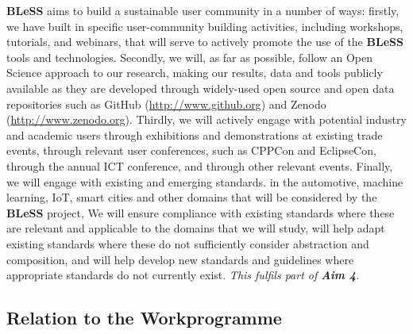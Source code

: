 \documentclass[a4paper,11pt]{article}
\newcommand{\project}[1]{\textbf{#1}\xspace}
\newcommand{\BLESS}{\project{BLeSS}}
\newcommand{\TheProject}{\BLESS}
\begin{document}
 \TheProject{} aims to build a sustainable user community in a number of ways: firstly, we have built in
 specific user-community building activities,
 including workshops, tutorials, and webinars, that will serve to
 actively promote the use of the \TheProject{} tools and technologies.
 Secondly, we will, as far as possible, follow an Open Science approach to our research,
 making our results, data and tools publicly available as they are
 developed through widely-used open source and
 open data repositories such as GitHub (\url{http://www.github.org}) and
 Zenodo (\url{http://www.zenodo.org}).  Thirdly, we will actively
 engage with potential industry and academic users through exhibitions
 and demonstrations at existing trade events, through relevant user
 conferences, such as CPPCon and EclipseCon, through the annual ICT
 conference, and through other relevant events.
 Finally, we will engage with existing and emerging standards.
 in the automotive, machine learning, IoT, smart cities and other domains that
 will be considered by the \TheProject{} project,
 We will ensure compliance with existing standards where
 these are relevant and applicable to the domains that we will study, will help 
 adapt existing standards where these do not
 sufficiently consider abstraction and composition, and will help develop new standards
 and guidelines where  appropriate standards do not currently exist.
\newline
 \emph{This fulfils part of \textbf{Aim 4}.}
 
\pagebreak
\subsection{Relation to the Workprogramme}


\end{document}
